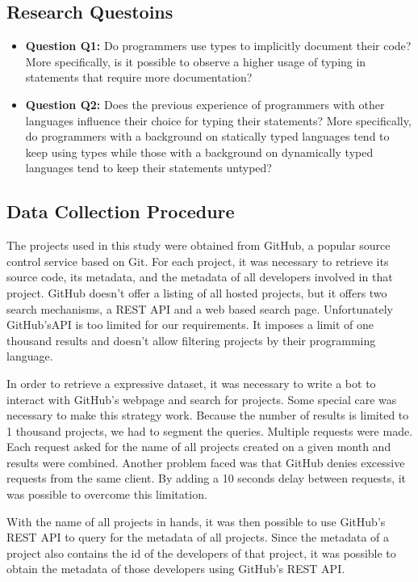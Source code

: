 \documentclass[preprint]{sigplanconf}
\begin{document}
\subsection{Research Questoins\label{questions}}


\begin{itemize}
	\item \textbf{Question Q1:} Do programmers use types to implicitly document their code? More specifically, is it possible to observe a higher usage of typing in statements that require more documentation? 
	
	\item \textbf{Question Q2:} Does the previous experience of programmers with other languages influence their choice for typing their statements? More specifically, do programmers with a background on statically typed languages tend to keep using types while those with a background on dynamically typed languages tend to keep their statements untyped?
\end{itemize}

\subsection{Data Collection Procedure\label{dataCollection}}
The projects used in this study were obtained from GitHub, a popular source control service based on Git.
For each project, it was necessary to retrieve its source code, its metadata, and the metadata of all developers involved in that project.
GitHub doesn't offer a listing of all hosted projects, but it offers two search mechanisms, a REST API and a web based search page.
Unfortunately GitHub'sAPI is too limited for our requirements.
It imposes a limit of one thousand results and doesn't allow filtering projects by their programming language.

In order to retrieve a expressive dataset, it was necessary to write a bot to interact with GitHub's webpage and search for projects. 
Some special care was necessary to make this strategy work. 
Because the number of results is limited to 1 thousand projects, we had to segment the queries.
Multiple requests were made.
Each request asked for the name of all projects created on a given month and results were combined.
Another problem faced was that GitHub denies excessive requests from the same client.
By adding a 10 seconds delay between requests, it was possible to overcome this limitation.

With the name of all projects in hands, it was then possible to use GitHub's REST API to query for the metadata of all projects.
Since the metadata of a project also contains the id of the developers of that project, it was possible to obtain the metadata of those developers using GitHub's REST API.
\end{document}
